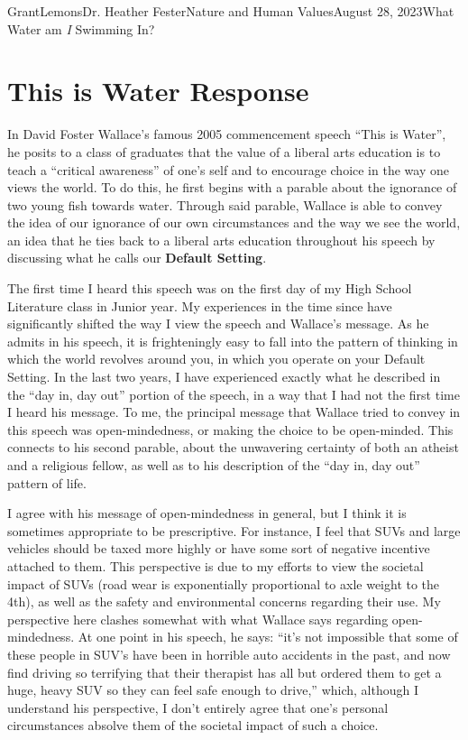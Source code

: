 \documentclass[12pt,letterpaper]{article}
\begin{document}
\begin{mla}{Grant}{Lemons}{Dr. Heather Fester}{Nature and Human Values}{August 28, 2023}{What Water am \textit{I} Swimming In?}
\justifying
    \section{This is Water Response}
        In David Foster Wallace's famous 2005 commencement speech \enquote{This is Water}, he posits to a class of graduates that the value of a liberal arts education is to teach a \enquote{critical awareness} of one's self and to encourage choice in the way one views the world.
        To do this, he first begins with a parable about the ignorance of two young fish towards water.
        Through said parable, Wallace is able to convey the idea of our ignorance of our own circumstances and the way we see the world, an idea that he ties back to a liberal arts education throughout his speech by discussing what he calls our \textbf{Default Setting}.

        The first time I heard this speech was on the first day of my High School Literature class in Junior year.
        My experiences in the time since have significantly shifted the way I view the speech and Wallace's message.
        As he admits in his speech, it is frighteningly easy to fall into the pattern of thinking in which the world revolves around you, in which you operate on your Default Setting.
        In the last two years, I have experienced exactly what he described in the \enquote{day in, day out} portion of the speech, in a way that I had not the first time I heard his message.
        To me, the principal message that Wallace tried to convey in this speech was open-mindedness, or making the choice to be open-minded.
        This connects to his second parable, about the unwavering certainty of both an atheist and a religious fellow, as well as to his description of the \enquote{day in, day out} pattern of life.

        I agree with his message of open-mindedness in general, but I think it is sometimes appropriate to be prescriptive.
        For instance, I feel that SUVs and large vehicles should be taxed more highly or have some sort of negative incentive attached to them.
        This perspective is due to my efforts to view the societal impact of SUVs (road wear is exponentially proportional to axle weight to the 4th), as well as the safety and environmental concerns regarding their use.
        My perspective here clashes somewhat with what Wallace says regarding open-mindedness.
        At one point in his speech, he says: \enquote{it's not impossible that some of these people in SUV’s have been in horrible auto accidents in the past, and now find driving so terrifying that their therapist has all but ordered them to get a huge, heavy SUV so they can feel safe enough to drive,} \autocite{water}
        which, although I understand his perspective, I don't entirely agree that one's personal circumstances absolve them of the societal impact of such a choice.

\end{mla}
\end{document}

